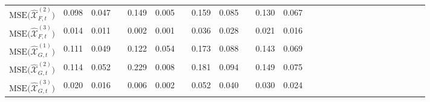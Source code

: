 \documentclass[aos]{imsart}
\theoremstyle{plain}
\theoremstyle{definition}
\def\wh#1{\widehat{#1}}
\def\cX{\mathcal{X}}
\begin{document}
\begin{table}
\begin{tabular}{@{}crrrrrrrrrrrrrrrrrrrrrrrrr@{}}
$\text{MSE}\big(\wh\cX_{F,t}^{(2)} \big)$ &  0.098 & 0.047 && 0.149 & 0.005  && 0.159 & 0.085 && 0.130 & 0.067 \\
$\text{MSE}\big(\wh\cX_{F,t}^{(3)} \big)$ &  0.014 & 0.011 && 0.002 & 0.001  && 0.036 & 0.028 && 0.021 & 0.016 \\
$\text{MSE}\big(\wh\cX_{G,t}^{(1)} \big)$ &  0.111 & 0.049 && 0.122 & 0.054  && 0.173 & 0.088 && 0.143 & 0.069 \\
$\text{MSE}\big(\wh\cX_{G,t}^{(2)} \big)$ &  0.114 & 0.052 && 0.229 & 0.008  && 0.181 & 0.094 && 0.149 & 0.075 \\
$\text{MSE}\big(\wh\cX_{G,t}^{(3)} \big)$ &  0.020 & 0.016 && 0.006 & 0.002  && 0.052 & 0.040 && 0.030 & 0.024  \\
\hline %
\end{tabular}
\end{table}
\end{document}
